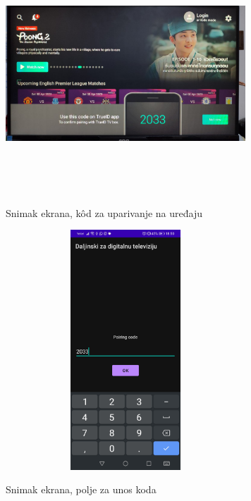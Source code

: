 \documentclass[implementacija.tex]{subfiles}
\begin{document}
\begin{figure}[h!]
\centering
\begin{minipage}{.6\textwidth}
 \centering
  \label{fig:kod_na_stb}
  \includegraphics[width=9cm,height=9cm,keepaspectratio]{Implementacija/snimci_ekrana/8_kod_za_uparivanje_na_stb.jpg}
  \caption{Snimak ekrana, k\^{o}d za uparivanje na uređaju}
\end{minipage}%
\begin{minipage}{.4\textwidth}
   \centering
  \label{fig:kod_na_mobilnom}
  \includegraphics[width=9cm,height=9cm,keepaspectratio]{Implementacija/snimci_ekrana/7_unos_koda_za_uparivanje.jpg}
  \caption{Snimak ekrana, polje za unos koda}
\end{minipage}
\end{figure}
\end{document}
